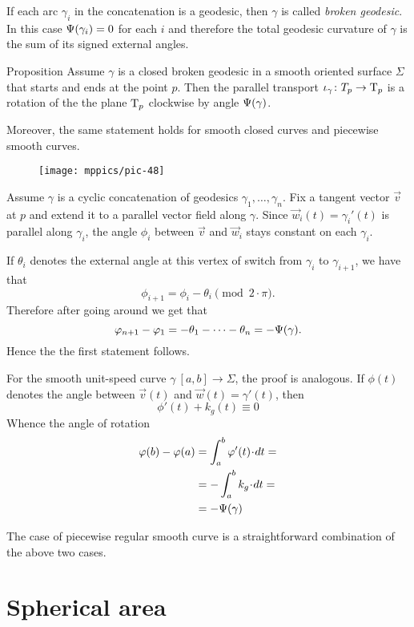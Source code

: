 If each arc $\gamma_i$ in the concatenation is a geodesic, then $\gamma$ is called \emph{broken geodesic}.
In this case $\Psi({\gamma_i})=0$ for each $i$ and therefore the total geodesic curvature of $\gamma$ is the sum of its signed external angles.

\begin{thm}{Proposition}\label{prop:pt+tgc}
Assume $\gamma$ is a closed broken geodesic in a smooth oriented surface $\Sigma$ that starts and ends at the point $p$.
Then the parallel transport $\iota_\gamma\colon T_p\to\mathrm{T}_p$ is a rotation of the the plane $\mathrm{T}_p$ clockwise by angle $\Psi({\gamma})$.

Moreover, the same statement holds for smooth closed curves and piecewise smooth curves.
\end{thm}

\begin{wrapfigure}{o}{22 mm}
\vskip-0mm
\centering
\texttt{[image: mppics/pic-48]}
\vskip-0mm
\end{wrapfigure}

Assume $\gamma$ is a cyclic concatenation of geodesics $\gamma_1,\dots,\gamma_n$.
Fix a tangent vector ${\vec v}$ at $p$ and extend it to a parallel vector field along $\gamma$.
Since ${\vec w}_i(t)=\gamma_i'(t)$ is parallel along $\gamma_i$, the angle $\phi_i$ between ${\vec v}$ and ${\vec w}_i$ stays constant on each $\gamma_i$.

If $\theta_i$ denotes the external angle at this vertex of switch from $\gamma_{i}$ to $\gamma_{i+1}$, we have that 
\[\phi_{i+1}=\phi_i-\theta_i \pmod{2\cdot\pi}.\]
Therefore after going around we get that 
\[\varphi_{n+1}-\varphi_1=-\theta_1-\dots-\theta_n=-\Psi({\gamma}).\]
Hence the the first statement follows.

For the smooth unit-speed curve $\gamma\:[a,b]\to\Sigma$, the proof is analogous.
If $\phi(t)$ denotes the angle between ${\vec v}(t)$ and ${\vec w}(t)=\gamma'(t)$, then 
\[\phi'(t)+k_g(t)\equiv0\]
Whence the angle of rotation 
\begin{align*}
\phi(b)-\phi(a)&=\int_a^b \phi'(t)\cdot dt=
\\
&=-\int_a^b k_g\cdot dt=
\\
&=-\tgc\gamma
\end{align*}

The case of piecewise regular smooth curve is a straightforward combination of the above two cases. 
\qeds


\section*{Spherical area}

